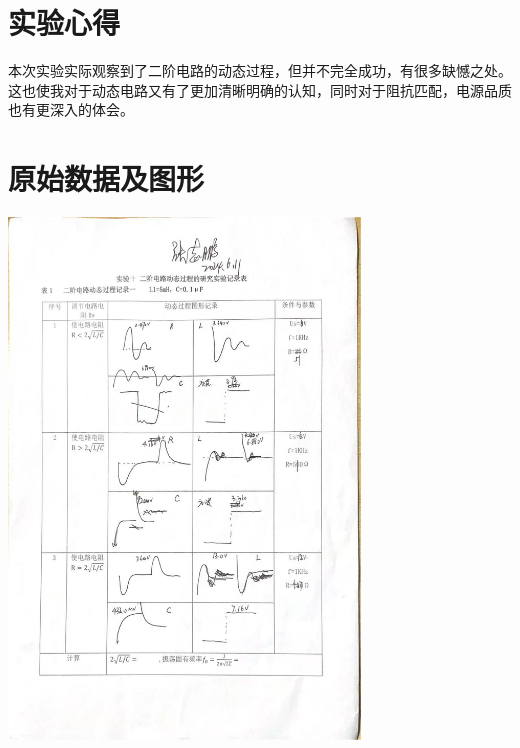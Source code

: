 \documentclass[a4paper,utf8]{article}
\begin{document}
\section{实验心得}
    本次实验实际观察到了二阶电路的动态过程，但并不完全成功，有很多缺憾之处。这也使我对于动态电路又有了更加清晰明确的认知，同时对于阻抗匹配，电源品质也有更深入的体会。
    \clearpage
    \section{原始数据及图形}
    \begin{center}
        \includegraphics[width=0.7\textwidth]{data1.jpg}
    \end{center}
\end{document}
